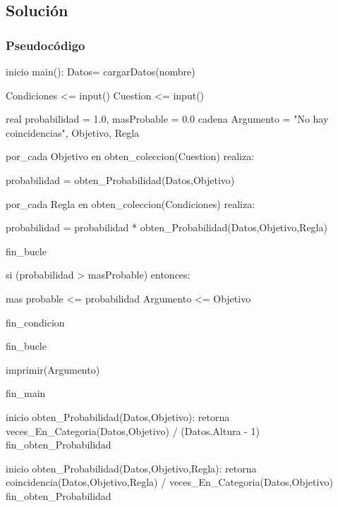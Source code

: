 \documentclass[
  spanish,
]{article}
\newenvironment{Shaded}{}{}
\newcommand{\BuiltInTok}[1]{#1}
\newcommand{\DecValTok}[1]{\textcolor[rgb]{0.25,0.63,0.44}{#1}}
\newcommand{\FloatTok}[1]{\textcolor[rgb]{0.25,0.63,0.44}{#1}}
\newcommand{\NormalTok}[1]{#1}
\newcommand{\OperatorTok}[1]{\textcolor[rgb]{0.40,0.40,0.40}{#1}}
\newcommand{\StringTok}[1]{\textcolor[rgb]{0.25,0.44,0.63}{#1}}
\begin{document}
\hypertarget{soluciuxf3n}{%
\subsection{Solución}\label{soluciuxf3n}}

\hypertarget{pseudocuxf3digo}{%
\subsubsection{Pseudocódigo}\label{pseudocuxf3digo}}

\begin{Shaded}
\begin{Highlighting}[]
\NormalTok{inicio main():}
\NormalTok{    Datos}\OperatorTok{=}\NormalTok{ cargarDatos(nombre)}

\NormalTok{    Condiciones }\OperatorTok{\textless{}=} \BuiltInTok{input}\NormalTok{()}
\NormalTok{    Cuestion    }\OperatorTok{\textless{}=} \BuiltInTok{input}\NormalTok{()}

\NormalTok{    real    probabilidad }\OperatorTok{=} \FloatTok{1.0}\NormalTok{, masProbable }\OperatorTok{=} \FloatTok{0.0}
\NormalTok{    cadena  Argumento }\OperatorTok{=} \StringTok{"No hay coincidencias"}\NormalTok{, Objetivo, Regla }

\NormalTok{    por\_cada Objetivo en obten\_coleccion(Cuestion) realiza:}

\NormalTok{        probabilidad }\OperatorTok{=}\NormalTok{ obten\_Probabilidad(Datos,Objetivo)}

\NormalTok{        por\_cada Regla en obten\_coleccion(Condiciones) realiza:}

\NormalTok{            probabilidad }\OperatorTok{=}\NormalTok{ probabilidad }\OperatorTok{*}\NormalTok{ obten\_Probabilidad(Datos,Objetivo,Regla)}

\NormalTok{        fin\_bucle}

\NormalTok{        si (probabilidad }\OperatorTok{\textgreater{}}\NormalTok{ masProbable) entonces:}

\NormalTok{            mas probable }\OperatorTok{\textless{}=}\NormalTok{ probabilidad}
\NormalTok{            Argumento    }\OperatorTok{\textless{}=}\NormalTok{ Objetivo}

\NormalTok{        fin\_condicion}

\NormalTok{    fin\_bucle}

\NormalTok{    imprimir(Argumento)}

\NormalTok{fin\_main}

\NormalTok{inicio obten\_Probabilidad(Datos,Objetivo):}
\NormalTok{    retorna veces\_En\_Categoria(Datos,Objetivo) }\OperatorTok{/}\NormalTok{ (Datos.Altura }\OperatorTok{{-}} \DecValTok{1}\NormalTok{)}
\NormalTok{fin\_obten\_Probabilidad}

\NormalTok{inicio obten\_Probabilidad(Datos,Objetivo,Regla):}
\NormalTok{    retorna coincidencia(Datos,Objetivo,Regla) }\OperatorTok{/}\NormalTok{ veces\_En\_Categoria(Datos,Objetivo)}
\NormalTok{fin\_obten\_Probabilidad}
\end{Highlighting}
\end{Shaded}
\end{document}
